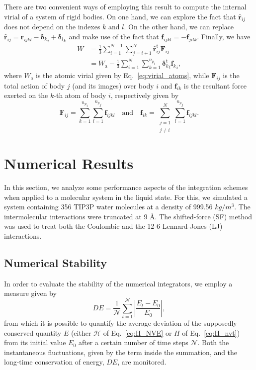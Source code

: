 \documentclass[aip,jcp,reprint,amsmath,amssymb]{revtex4-1}
\newcommand{\vt}[1]{\boldsymbol{\mathbf{#1}}}           %
\newcommand{\tr}[1]{#1^\text{t}}                        %
\begin{document}
There are two convenient ways of employing this result to compute the internal virial of a system of rigid bodies. On one hand, we can explore the fact that ${\hat{\vt r}}_{ij}$ does not depend on the indexes $k$ and $l$. On the other hand, we can replace $\hat{\vt r}_{ij} = {\vt r}_{ijkl} - {{\vt \delta}_k}_i + {{\vt \delta}_l}_k$ and make use of the fact that $\vt f_{ijkl} = -\vt f_{jilk}$. Finally, we have
\begin{subequations}
	\label{eq:virial_rigid_bodies}
	\begin{align}
	W &= \frac{1}{3} \sum_{i=1}^{N-1} \sum_{j=i+1}^N \tr{\hat{\vt r}}_{ij} \vt F_{ij} \\
	  &= W_\text{a} - \frac{1}{3} \sum_{i=1}^N \sum_{k=1}^{{n_p}_i} {\tr{\vt \delta}_k}_i {{\vt f}_k}_i,
	\end{align}
\end{subequations}
where $W_\text{a}$ is the atomic virial given by Eq.~\ref{eq:virial_atoms}, while $\vt F_{ij}$ is the total action of body $j$ (and its images) over body $i$ and $\vt f_{ik}$ is the resultant force exerted on the $k$-th atom of body $i$, respectively given by
\
\[
\vt F_{ij} = \sum_{k=1}^{{n_p}_i} \sum_{l=1}^{{n_p}_j} \vt f_{ijkl} \quad \text{and} \quad \vt f_{ik} = \sum_{\substack{j=1\\j \neq i}}^N \sum_{l=1}^{{n_p}_j} \vt f_{ijkl}.
\]

\section{Numerical Results}
\label{sec:numerical_results}

In this section, we analyze some performance aspects of the integration schemes when applied to a molecular system in the liquid state. For this, we simulated a system containing 356 TIP3P water molecules\cite{Price2004} at a density of 999.56 $kg/m^3$. The intermolecular interactions were truncated at 9 \AA. The shifted-force (SF) method\cite{Allen1989, Fennell2006, Toxvaerd_2011} was used to treat both the Coulombic and the 12-6 Lennard-Jones (LJ) interactions.

\subsection{Numerical Stability}
\label{sec:performance}

In order to evaluate the stability of the numerical integrators, we employ a measure given by\cite{Tuckerman2010}
\begin{equation}
\label{eq:performance}
D\!E =  \frac{1}{\mathcal N} \sum_{t=1}^{\mathcal N} \left| \frac{E_t - E_0}{E_0} \right|,
\end{equation}
from which it is possible to quantify the average deviation of the supposedly conserved quantity $E$ (either $\mathcal{H}$ of Eq.~\ref{eq:H_NVE} or $H$ of Eq.~\ref{eq:H_nvt}) from its initial value $E_0$ after a certain number of time steps $\mathcal N$. Both the instantaneous fluctuations, given by the term inside the summation, and the long-time conservation of energy, $D\!E$, are monitored.
\end{document}
